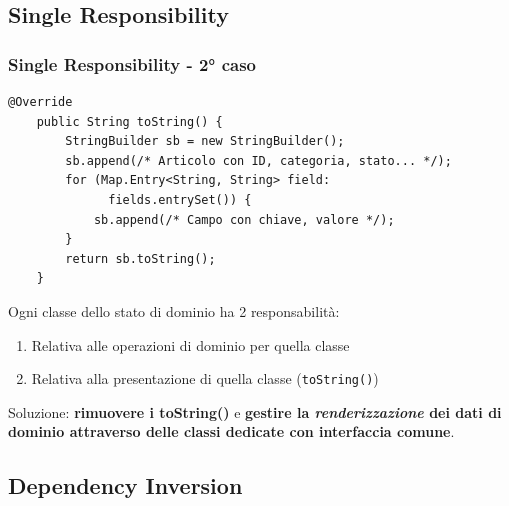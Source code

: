 \subsection{Single Responsibility}

\begin{frame}[fragile]
    \frametitle{Single Responsibility - 2° caso}
    \begin{lstlisting}[autogobble, title={\texttt{toString()} di \texttt{Article.java}}]
    @Override
    public String toString() {
        StringBuilder sb = new StringBuilder();
        sb.append(/* Articolo con ID, categoria, stato... */);
        for (Map.Entry<String, String> field:
              fields.entrySet()) {
            sb.append(/* Campo con chiave, valore */);
        }
        return sb.toString();
    }
    \end{lstlisting}

    Ogni classe dello stato di dominio ha 2 responsabilità:
    \begin{enumerate}
        \item Relativa alle operazioni di dominio per quella classe
        \item Relativa alla presentazione di quella classe (\texttt{toString()})
    \end{enumerate}

    Soluzione: \textbf{rimuovere i toString()} e \textbf{gestire la \emph{renderizzazione} dei dati di dominio
    attraverso delle classi dedicate con interfaccia comune}.
\end{frame}

\subsection{Dependency Inversion}
